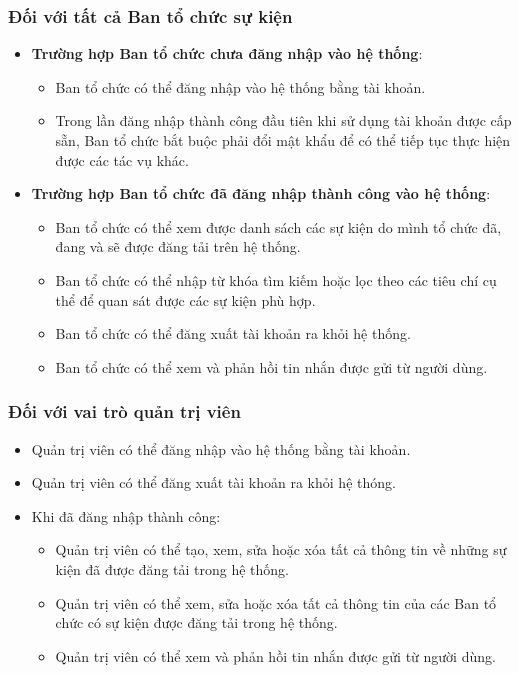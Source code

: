 \subsubsection{Đối với tất cả Ban tổ chức sự kiện}
\begin{itemize}
    \item[\textbf{-}] \textbf{Trường hợp Ban tổ chức chưa đăng nhập vào hệ thống}:
        \begin{itemize}
            \item[+] Ban tổ chức có thể đăng nhập vào hệ thống bằng tài khoản.
            \item[+] Trong lần đăng nhập thành công đầu tiên khi sử dụng tài khoản được cấp sẵn, Ban tổ chức bắt buộc phải đổi mật khẩu để có thể tiếp tục thực hiện được các tác vụ khác.
        \end{itemize}
    \item[\textbf{-}] \textbf{Trường hợp Ban tổ chức đã đăng nhập thành công vào hệ thống}:
        \begin{itemize}
            \item[+] Ban tổ chức có thể xem được danh sách các sự kiện do mình tổ chức đã, đang và sẽ được đăng tải trên hệ thống.
            \item[+] Ban tổ chức có thể nhập từ khóa tìm kiếm hoặc lọc theo các tiêu chí cụ thể để quan sát được các sự kiện phù hợp.
            \item[+] Ban tổ chức có thể đăng xuất tài khoản ra khỏi hệ thống.
            \item[+] Ban tổ chức có thể xem và phản hồi tin nhắn được gửi từ người dùng.
        \end{itemize}
\end{itemize}
\subsubsection{Đối với vai trò quản trị viên}
\begin{itemize}
    \item[-] Quản trị viên có thể đăng nhập vào hệ thống bằng tài khoản.
    \item[-] Quản trị viên có thể đăng xuất tài khoản ra khỏi hệ thóng.
    \item[-] Khi đã đăng nhập thành công:
    \begin{itemize}
        \item[+] Quản trị viên có thể tạo, xem, sửa hoặc xóa tất cả thông tin về những sự kiện đã được đăng tải trong hệ thống.
        \item[+] Quản trị viên có thể xem, sửa hoặc xóa tất cả thông tin của các Ban tổ chức có sự kiện được đăng tải trong hệ thống.
        \item[+] Quản trị viên có thể xem và phản hồi tin nhắn được gửi từ người dùng.
    \end{itemize}
\end{itemize}
